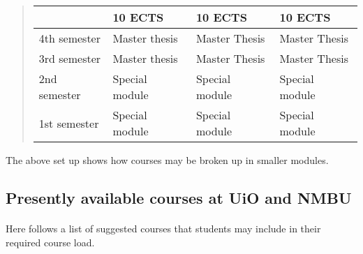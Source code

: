 \documentclass[%
oneside,                 %
final,                   %
10pt]{article}
\begin{document}
\begin{quote}
\begin{tabular}{llll}
\hline
\multicolumn{1}{l}{  } & \multicolumn{1}{l}{ 10 ECTS } & \multicolumn{1}{l}{ 10 ECTS } & \multicolumn{1}{l}{ 10 ECTS } \\
\hline
4th semester & Master thesis  & Master Thesis  & Master Thesis  \\
\hline
3rd semester & Master thesis  & Master Thesis  & Master Thesis  \\
\hline
2nd semester & Special module & Special module & Special module \\
\hline
1st semester & Special module & Special module & Special module \\
\hline
\end{tabular}
\end{quote}

\noindent
The above set up shows how courses may be broken up in smaller modules.






\subsection*{Presently available courses at UiO and NMBU}

\paragraph{}
Here follows a list of suggested courses that students may include in their required course load.
\end{document}
